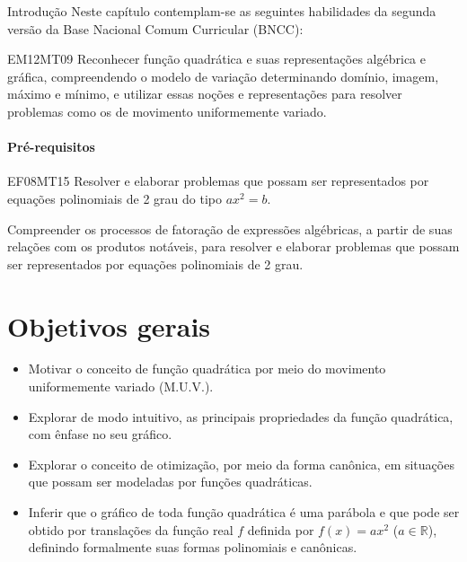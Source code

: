 \mainmatter

\begin{apresentacao}{Introdução}
Neste capítulo contemplam-se as seguintes habilidades da segunda versão da Base Nacional Comum Curricular (BNCC):

\begin{habilities}{EM12MT09}
Reconhecer função quadrática e suas representações algébrica e gráfica, compreendendo o modelo de variação determinando domínio, imagem, máximo e mínimo, e utilizar essas noções e representações para resolver problemas como os de movimento uniformemente variado.
\end{habilities}

\paragraph{Pré-requisitos}
\begin{habilities}{EF08MT15}
Resolver e elaborar problemas que possam ser representados por equações polinomiais de 2 grau do tipo $ax^2=b$.

Compreender os processos de fatoração de expressões algébricas, a partir de suas relações com os produtos notáveis, para resolver e elaborar problemas que possam ser representados por equações polinomiais de 2 grau.
\end{habilities}

\section{Objetivos gerais}

\begin{itemize}
\item {} 
Motivar o conceito de função quadrática por meio do movimento uniformemente variado (M.U.V.).

\item {} 
Explorar de modo intuitivo, as principais propriedades da função quadrática, com ênfase no seu gráfico.

\item {} 
Explorar o conceito de otimização, por meio da forma canônica, em situações que possam ser modeladas por funções quadráticas.

\item {} 
Inferir que o gráfico de toda função quadrática é uma parábola e que pode ser obtido por translações da função real \(f\) definida por \(f(x)=ax^2\) (\(a \in \mathbb{R}\)), definindo formalmente suas formas polinomiais e canônicas.


\end{itemize}
\end{apresentacao}
